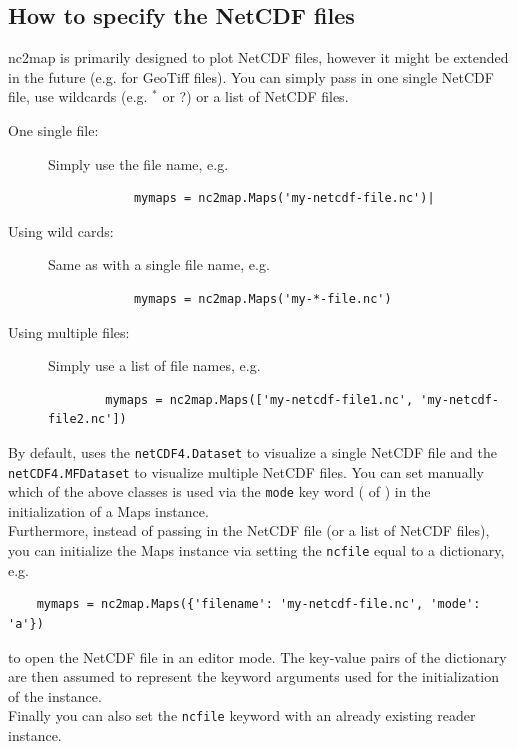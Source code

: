 \subsection{How to specify the NetCDF files} \label{sec:init_nc}
\gls{nc2map} is primarily designed to plot NetCDF files, however it might be extended in the future (e.g. for GeoTiff files). You can simply pass in one single NetCDF file, use wildcards (e.g. $^*$ or ?) or a list of NetCDF files.
\begin{description}
	\item[One single file:] Simply use the file name, e.g. 
		\begin{lstlisting}
			mymaps = nc2map.Maps('my-netcdf-file.nc')|
		\end{lstlisting}
	\item[Using wild cards:] Same as with a single file name, e.g. 
		\begin{lstlisting}
			mymaps = nc2map.Maps('my-*-file.nc')
		\end{lstlisting}
	\item[Using multiple files:] Simply use a list of file names, e.g. 
	\begin{lstlisting}
		mymaps = nc2map.Maps(['my-netcdf-file1.nc', 'my-netcdf-file2.nc'])
	\end{lstlisting}
\end{description}
By default,  uses the \lstinline|netCDF4.Dataset| to visualize a single NetCDF file and the \lstinline|netCDF4.MFDataset| to visualize multiple NetCDF files. You can set manually which of the above classes is used via the \lstinline|mode| key word ( of ) in the initialization of a \gls{Maps} instance. \\
Furthermore, instead of passing in the NetCDF file (or a list of NetCDF files), you can initialize the \gls{Maps} instance via setting the \lstinline|ncfile| equal to a dictionary, e.g.
\begin{lstlisting}
	mymaps = nc2map.Maps({'filename': 'my-netcdf-file.nc', 'mode': 'a'})
\end{lstlisting}
to open the NetCDF file in an editor mode. The key-value pairs of the dictionary are then assumed to represent the keyword arguments used for the initialization of the  instance. \\
Finally you can also set the \lstinline|ncfile| keyword with an already existing \gls{reader} instance.


